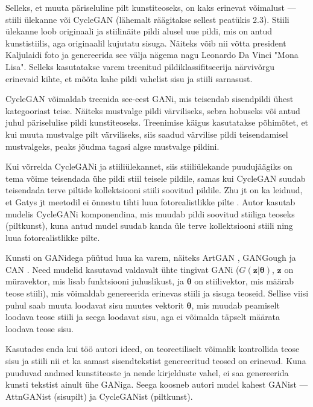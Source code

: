 \documentclass{vilgym}
\begin{document}
	Selleks, et muuta päriseluline pilt kunstiteoseks, on kaks erinevat võimalust --- stiili ülekanne  või CycleGAN (lähemalt räägitakse sellest peatükis 2.3). Stiili ülekanne loob originaali ja stiilinäite pildi alusel uue pildi, mis on antud kunstistiilis, aga originaalil kujutatu sisuga. Näiteks võib nii võtta president Kaljulaidi foto ja genereerida see välja nägema nagu Leonardo Da Vinci "Mona Lisa". Selleks kasutatakse varem treenitud pildiklassifitseerija närvivõrgu erinevaid kihte, et mõõta kahe pildi vahelist sisu ja stiili sarnasust. \parencite{styletransfer}

	CycleGAN võimaldab treenida see-eest GANi, mis teisendab sisendpildi ühest kategooriast teise. Näiteks mustvalge pildi värviliseks, sebra hobuseks või antud juhul päriselulise pildi kunstiteoseks. Treenimise käigus kasutatakse põhimõtet, et kui muuta mustvalge pilt värviliseks, siis saadud värvilise pildi teisendamisel mustvalgeks, peaks jõudma tagasi algse mustvalge pildini. \parencite{cyclegan}

	Kui võrrelda CycleGANi ja stiiliülekannet, siis stiiliülekande puudujäägiks on tema võime teisendada ühe pildi stiil teisele pildile, samas kui CycleGAN suudab teisendada terve piltide kollektsiooni stiili soovitud pildile. Zhu jt on ka leidnud, et Gatys jt meetodil ei õnnestu tihti luua fotorealistlikke pilte \parencite{cyclegan, styletransfer}. Autor kasutab mudelis CycleGANi komponendina, mis muudab pildi soovitud stiiliga teoseks (pilt\textrightarrow kunst), kuna antud mudel suudab kanda üle terve kollektsiooni stiili ning luua fotorealistlikke pilte.

	Kunsti on GANidega püütud luua ka varem, näiteks ArtGAN \parencite{artgan}, GANGough \parencite{gangough} ja CAN \parencite{can}. Need mudelid kasutavad valdavalt ühte tingivat GANi ($ G(\boldsymbol{z}|\boldsymbol{\theta}) $, $ \boldsymbol{z} $ on müravektor, mis lisab funktsiooni juhuslikust, ja $ \boldsymbol{\theta} $ on stiilivektor, mis määrab teose stiili), mis võimaldab genereerida erinevas stiili ja sisuga teoseid. Sellise viisi puhul saab muuta loodavat sisu muutes vektorit $ \boldsymbol{\theta} $, mis muudab peamiselt loodava teose stiili ja seega loodavat sisu, aga ei võimalda täpselt määrata loodava teose sisu. 

	Kasutades enda kui töö autori ideed, on teoreetiliselt võimalik kontrollida teose sisu ja stiili nii et ka samast sisendtekstist genereeritud teosed on erinevad. Kuna puuduvad andmed kunstiteoste ja nende kirjelduste vahel, ei saa genereerida kunsti tekstist ainult ühe GANiga. Seega koosneb autori mudel kahest GANist --- AttnGANist (sisu\textrightarrow pilt) ja CycleGANist (pilt\textrightarrow kunst). %
\end{document}
